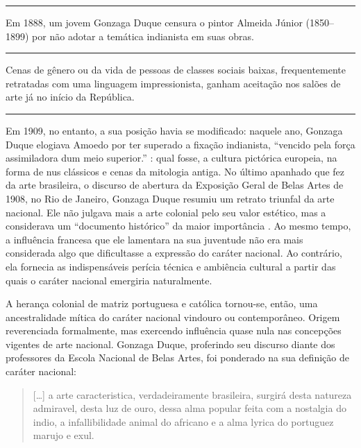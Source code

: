 \begin{center}\rule{0.5\linewidth}{0.5pt}\end{center}

Em 1888, um jovem Gonzaga Duque censura o pintor Almeida Júnior
(1850--1899) por não adotar a temática indianista em suas obras.

\begin{center}\rule{0.5\linewidth}{0.5pt}\end{center}

Cenas de gênero ou da vida de pessoas de classes sociais baixas,
frequentemente retratadas com uma linguagem impressionista, ganham
aceitação nos salões de arte já no início da República.

\begin{center}\rule{0.5\linewidth}{0.5pt}\end{center}

Em 1909, no entanto, a sua posição havia se modificado: naquele ano,
Gonzaga Duque elogiava Amoedo por ter superado a fixação indianista,
``vencido pela força assimiladora dum meio superior.''
\autocite[p.~13]{gonzagaduque:1929contemporaneos}: qual fosse, a cultura
pictórica europeia, na forma de nus clássicos e cenas da mitologia
antiga. No último apanhado que fez da arte brasileira, o discurso de
abertura da Exposição Geral de Belas Artes de 1908, no Rio de Janeiro,
Gonzaga Duque resumiu um retrato triunfal da arte nacional. Ele não
julgava mais a arte colonial pelo seu valor estético, mas a considerava
um ``documento histórico'' da maior importância
\autocite[p.~247]{gonzagaduque:1929contemporaneos}. Ao mesmo tempo, a
influência francesa que ele lamentara na sua juventude não era mais
considerada algo que dificultasse a expressão do caráter nacional. Ao
contrário, ela fornecia as indispensáveis perícia técnica e ambiência
cultural a partir das quais o caráter nacional emergiria naturalmente.

A herança colonial de matriz portuguesa e católica tornou-se, então, uma
ancestralidade mítica do caráter nacional vindouro ou contemporâneo.
Origem reverenciada formalmente, mas exercendo influência quase nula nas
concepções vigentes de arte nacional. Gonzaga Duque, proferindo seu
discurso diante dos professores da Escola Nacional de Belas Artes, foi
ponderado na sua definição de caráter nacional:

\begin{quote}
{[}\ldots{]} a arte caracteristica, verdadeiramente brasileira, surgirá
desta natureza admiravel, desta luz de ouro, dessa alma popular feita
com a nostalgia do indio, a infallibilidade animal do africano e a alma
lyrica do portuguez marujo e exul. \autocite[
p.~255]{gonzagaduque:1929contemporaneos}
\end{quote}

